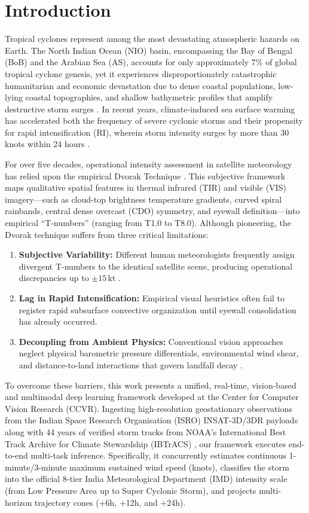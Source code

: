 \documentclass[conference]{IEEEtran}
\begin{document}
\section{Introduction}
Tropical cyclones represent among the most devastating atmospheric hazards on Earth. The North Indian Ocean (NIO) basin, encompassing the Bay of Bengal (BoB) and the Arabian Sea (AS), accounts for only approximately 7\% of global tropical cyclone genesis, yet it experiences disproportionately catastrophic humanitarian and economic devastation due to dense coastal populations, low-lying coastal topographies, and shallow bathymetric profiles that amplify destructive storm surges \cite{b1}. In recent years, climate-induced sea surface warming has accelerated both the frequency of severe cyclonic storms and their propensity for rapid intensification (RI), wherein storm intensity surges by more than 30 knots within 24 hours \cite{b8}.

For over five decades, operational intensity assessment in satellite meteorology has relied upon the empirical Dvorak Technique \cite{b1}. This subjective framework maps qualitative spatial features in thermal infrared (TIR) and visible (VIS) imagery—such as cloud-top brightness temperature gradients, curved spiral rainbands, central dense overcast (CDO) symmetry, and eyewall definition—into empirical ``T-numbers'' (ranging from T1.0 to T8.0). Although pioneering, the Dvorak technique suffers from three critical limitations:
\begin{enumerate}
    \item \textbf{Subjective Variability:} Different human meteorologists frequently assign divergent T-numbers to the identical satellite scene, producing operational discrepancies up to $\pm 15$\,kt \cite{b6}.
    \item \textbf{Lag in Rapid Intensification:} Empirical visual heuristics often fail to register rapid subsurface convective organization until eyewall consolidation has already occurred.
    \item \textbf{Decoupling from Ambient Physics:} Conventional vision approaches neglect physical barometric pressure differentials, environmental wind shear, and distance-to-land interactions that govern landfall decay \cite{b7}.
\end{enumerate}

To overcome these barriers, this work presents a unified, real-time, vision-based and multimodal deep learning framework developed at the Center for Computer Vision Research (CCVR). Ingesting high-resolution geostationary observations from the Indian Space Research Organisation (ISRO) INSAT-3D/3DR payloads along with 44 years of verified storm tracks from NOAA’s International Best Track Archive for Climate Stewardship (IBTrACS) \cite{b2}, our framework executes end-to-end multi-task inference. Specifically, it concurrently estimates continuous 1-minute/3-minute maximum sustained wind speed (knots), classifies the storm into the official 8-tier India Meteorological Department (IMD) intensity scale (from Low Pressure Area up to Super Cyclonic Storm), and projects multi-horizon trajectory cones (+6h, +12h, and +24h).
\end{document}

